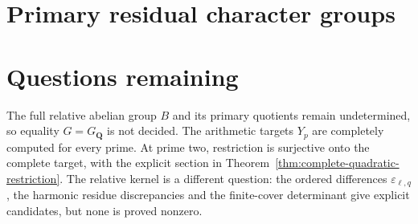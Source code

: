 \documentclass[11pt,a4paper]{article}
\theoremstyle{definition}
\theoremstyle{remark}
\newcommand{\Q}{\mathbf Q}
\begin{document}
\section{Primary residual character groups}















































\section{Questions remaining}
The full relative abelian group \(B\) and its primary quotients remain
undetermined, so equality \(G=G_{\Q}\) is not decided. The arithmetic
targets \(Y_p\) are completely computed for every prime. At prime two,
restriction is surjective onto the complete target, with the explicit
section in Theorem~\ref{thm:complete-quadratic-restriction}.
The relative kernel is a different question: the ordered differences
\(\varepsilon_{\ell,q}\), the harmonic residue discrepancies and
the finite-cover determinant give explicit candidates, but none is
proved nonzero.
\end{document}
